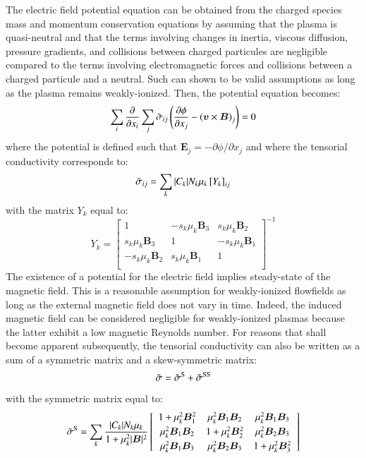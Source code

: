 \documentclass[twoside,9pt,twocolumn]{aiaa}
\newcommand{\alb}{\vspace{0.1cm}\\} %
\renewcommand{\vec}[1]{\bm{#1}}
\begin{document}
The electric field potential equation can be obtained from the charged species mass and momentum conservation equations by assuming that the plasma is quasi-neutral and that the terms involving changes in inertia, viscous diffusion, pressure gradients, and collisions between charged particules are negligible compared to the terms involving electromagnetic forces and collisions between a charged particule and a neutral. Such can shown to be valid assumptions as long as the plasma remains weakly-ionized. Then, the potential equation becomes:
%
\begin{equation}
  \sum_i \frac{\partial}{\partial x_i} \sum_j  \wtilde{\sigma}_{ij} \left(\frac{\partial \phi}{\partial x_j}  - \left(\vec{v} \times \vec{B}\right)_j\right) =0
\end{equation}
%
where the  potential is defined such that $\vec{E}_j=-\partial \phi / \partial x_j$ and where the tensorial conductivity corresponds to:
%
\begin{equation}
\tilde{\sigma}_{ij}=\sum_k |C_k| N_k \mu_k \left[Y_k\right]_{ij}
\end{equation}
%
with the matrix $Y_k$ equal to:
%
\begin{equation}
  Y_k = \left[\begin{array}{ccc} 
      1 & -s_k \mu_k \vec{B}_3  &  s_k \mu_k \vec{B}_2 \\
      s_k \mu_k \vec{B}_3 &  1 &  -s_k \mu_k \vec{B}_1 \\
      -s_k \mu_k \vec{B}_2 &  s_k \mu_k \vec{B}_1 & 1  \\
    \end{array} \right]^{-1}
\end{equation}
%
The existence of a potential for the electric field implies steady-state of the magnetic field. This is a reasonable assumption for weakly-ionized flowfields as long as the external magnetic field  does not vary in time. Indeed, the induced magnetic field can be considered negligible for weakly-ionized plasmas because the latter exhibit a low magnetic Reynolds number. For reasons that shall become apparent subsequently, the tensorial conductivity can also be written as a sum of a symmetric matrix and a skew-symmetric matrix:
%
\begin{equation}
  \tilde{\sigma}=\tilde{\sigma}^{\rm S} + \tilde{\sigma}^{\rm SS}
\end{equation}
%
with the symmetric matrix equal to:
%
\begin{equation}
\wtilde{\sigma}^{\rm S}=\sum_k \frac{|C_k| N_k \mu_k}{1+\mu_k^2|\vec{B}|^2} 
\left[\begin{array}{ccc}
1+\mu_k^2\vec{B}_1^2
  & \mu_k^2 \vec{B}_1 \vec{B}_2 
  & \mu_k^2\vec{B}_1 \vec{B}_3  \alb
\mu_k^2 \vec{B}_1 \vec{B}_2  
  & 1+\mu_k^2\vec{B}_2^2
  & \mu_k^2\vec{B}_2 \vec{B}_3  \alb
\mu_k^2\vec{B}_1 \vec{B}_3  
  & \mu_k^2\vec{B}_2 \vec{B}_3 
  & 1+\mu_k^2\vec{B}_3^2
\end{array}
\right]
\end{equation}
\end{document}
